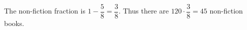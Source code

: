 The non-fiction fraction is $1-\dfrac{5}{8}=\dfrac{3}{8}$. Thus there are $120\cdot\dfrac{3}{8}=\boxed{45}$ non-fiction books.
